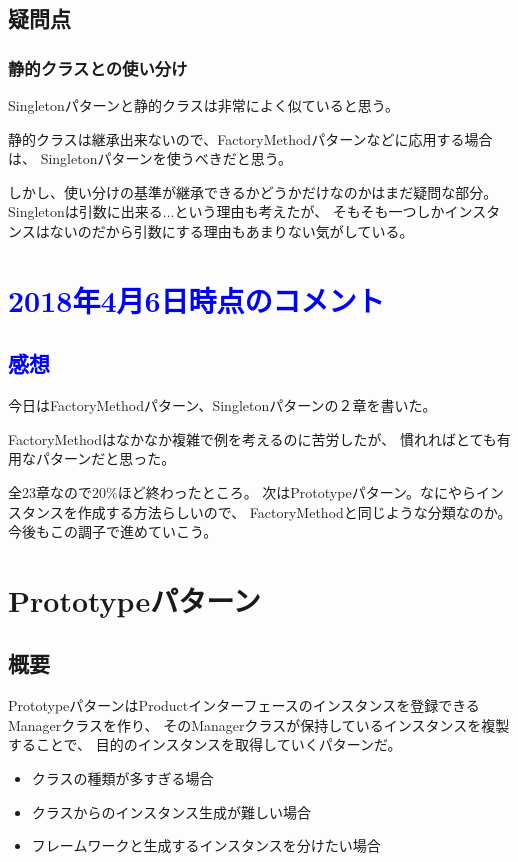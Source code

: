 \documentclass[11pt]{jsarticle}
\begin{document}
		\color{red}
		\subsection{疑問点}
			\subsubsection{静的クラスとの使い分け}
				Singletonパターンと静的クラスは非常によく似ていると思う。
				
				静的クラスは継承出来ないので、FactoryMethodパターンなどに応用する場合は、
				Singletonパターンを使うべきだと思う。
				
				しかし、使い分けの基準が継承できるかどうかだけなのかはまだ疑問な部分。
				Singletonは引数に出来る...という理由も考えたが、
				そもそも一つしかインスタンスはないのだから引数にする理由もあまりない気がしている。
		\color{black}
			
	\section*{\textcolor{blue}{2018年4月6日時点のコメント}}
		\subsection*{\textcolor{blue}{感想}}
		今日はFactoryMethodパターン、Singletonパターンの２章を書いた。
		
		FactoryMethodはなかなか複雑で例を考えるのに苦労したが、
		慣れればとても有用なパターンだと思った。
		
		全23章なので$20\%$ほど終わったところ。
		次はPrototypeパターン。なにやらインスタンスを作成する方法らしいので、
		FactoryMethodと同じような分類なのか。
		今後もこの調子で進めていこう。
		\clearpage	
			
	\section{Prototypeパターン}
		\subsection{概要}
			PrototypeパターンはProductインターフェースのインスタンスを登録できるManagerクラスを作り、
			そのManagerクラスが保持しているインスタンスを複製することで、
			目的のインスタンスを取得していくパターンだ。
			
			\begin{itemize}
				\item{クラスの種類が多すぎる場合}
				\item{クラスからのインスタンス生成が難しい場合}
				\item{フレームワークと生成するインスタンスを分けたい場合}
			\end{itemize}
			
\end{document}
